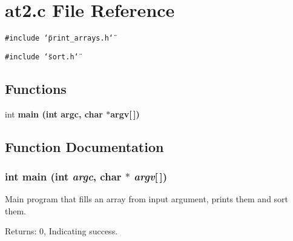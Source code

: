 \section{at2.c File Reference}
\label{at2_8c}
{\tt \#include \char`\"{}print\_\-arrays.h\char`\"{}}\par
{\tt \#include \char`\"{}sort.h\char`\"{}}\par
\subsection*{Functions}
\begin{CompactItemize}
\item 
int \bf{main} (int argc, char $\ast$argv[$\,$])
\end{CompactItemize}


\subsection{Function Documentation}
\subsubsection{\setlength{\rightskip}{0pt plus 5cm}int main (int {\em argc}, char $\ast$ {\em argv}[$\,$])}\label{at2_8c_0ddf1224851353fc92bfbff6f499fa97}


Main program that fills an array from input argument, prints them and sort them. \begin{Desc}
\item[Returns:]0, Indicating success. \end{Desc}
